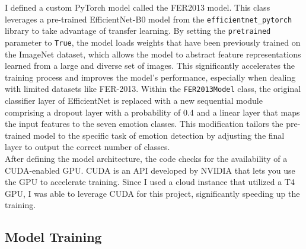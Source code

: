 \documentclass{article}
\begin{document}
I defined a custom PyTorch model called the FER2013 model. This class leverages a pre-trained EfficientNet-B0 model from the \texttt{efficientnet\_pytorch} library to take advantage of transfer learning. By setting the \texttt{pretrained} parameter to \texttt{True}, the model loads weights that have been previously trained on the ImageNet dataset, which allows the model to abstract feature representations learned from a large and diverse set of images. This significantly accelerates the training process and improves the model’s performance, especially when dealing with limited datasets like FER-2013. Within the \texttt{FER2013Model} class, the original classifier layer of EfficientNet is replaced with a new sequential module comprising a dropout layer with a probability of 0.4 and a linear layer that maps the input features to the seven emotion classes. This modification tailors the pre-trained model to the specific task of emotion detection by adjusting the final layer to output the correct number of classes.
\\
After defining the model architecture, the code checks for the availability of a CUDA-enabled GPU. CUDA is an API developed by NVIDIA that lets you use the GPU to accelerate training. Since I used a cloud instance that utilized a T4 GPU, I was able to leverage CUDA for this project, significantly speeding up the training.
\\
\subsection*{Model Training}
\end{document}
